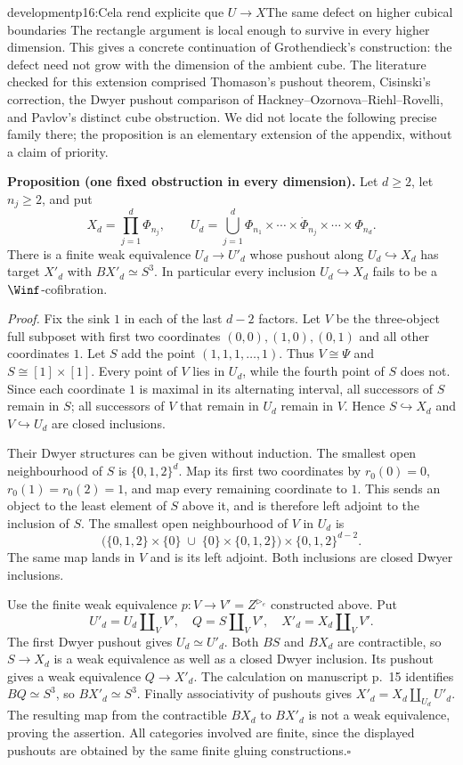 \begin{dcomment}{development}{p16:Cela rend explicite que $U \longrightarrow X$}{The same defect on higher cubical boundaries}
The rectangle argument is local enough to survive in every higher dimension. This gives a concrete continuation of Grothendieck's construction: the defect need not grow with the dimension of the ambient cube. The literature checked for this extension comprised Thomason's pushout theorem, Cisinski's correction, the Dwyer pushout comparison of Hackney--Ozornova--Riehl--Rovelli, and Pavlov's distinct cube obstruction. We did not locate the following precise family there; the proposition is an elementary extension of the appendix, without a claim of priority.

\textbf{Proposition (one fixed obstruction in every dimension).}\ours
Let $d\geq2$, let $n_j\geq2$, and put
\[
 X_d=\prod_{j=1}^d\Phi_{n_j},\qquad
 U_d=\bigcup_{j=1}^d
   \Phi_{n_1}\times\cdots\times\dot\Phi_{n_j}\times\cdots\times\Phi_{n_d}.
\]
There is a finite weak equivalence $U_d\to U'_d$ whose pushout along $U_d\hookrightarrow X_d$ has target $X'_d$ with $BX'_d\simeq S^3$. In particular every inclusion $U_d\hookrightarrow X_d$ fails to be a $\Winf$-cofibration.

\emph{Proof.} Fix the sink $1$ in each of the last $d-2$ factors. Let $V$ be the three-object full subposet with first two coordinates $(0,0),(1,0),(0,1)$ and all other coordinates $1$. Let $S$ add the point $(1,1,1,\ldots,1)$. Thus $V\cong\Psi$ and $S\cong[1]\times[1]$. Every point of $V$ lies in $U_d$, while the fourth point of $S$ does not. Since each coordinate $1$ is maximal in its alternating interval, all successors of $S$ remain in $S$; all successors of $V$ that remain in $U_d$ remain in $V$. Hence $S\hookrightarrow X_d$ and $V\hookrightarrow U_d$ are closed inclusions.

Their Dwyer structures can be given without induction. The smallest open neighbourhood of $S$ is $\{0,1,2\}^d$. Map its first two coordinates by $r_0(0)=0$, $r_0(1)=r_0(2)=1$, and map every remaining coordinate to $1$. This sends an object to the least element of $S$ above it, and is therefore left adjoint to the inclusion of $S$. The smallest open neighbourhood of $V$ in $U_d$ is
\[
 \bigl(\{0,1,2\}\times\{0\}\;\cup\;
       \{0\}\times\{0,1,2\}\bigr)\times\{0,1,2\}^{d-2}.
\]
The same map lands in $V$ and is its left adjoint. Both inclusions are closed Dwyer inclusions.

Use the finite weak equivalence $p:V\to V'=Z^{\triangleright_e}$ constructed above. Put
\[
 U'_d=U_d\amalg_VV',\quad Q=S\amalg_VV',\quad
 X'_d=X_d\amalg_VV'.
\]
The first Dwyer pushout gives $U_d\simeq U'_d$. Both $BS$ and $BX_d$ are contractible, so $S\to X_d$ is a weak equivalence as well as a closed Dwyer inclusion. Its pushout gives a weak equivalence $Q\to X'_d$. The calculation on manuscript p.~15 identifies $BQ\simeq S^3$, so $BX'_d\simeq S^3$. Finally associativity of pushouts gives $X'_d=X_d\amalg_{U_d}U'_d$. The resulting map from the contractible $BX_d$ to $BX'_d$ is not a weak equivalence, proving the assertion. All categories involved are finite, since the displayed pushouts are obtained by the same finite gluing constructions.\hfill$\square$
\end{dcomment}

